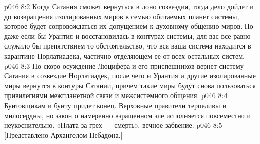 \vs p046 8:2 Когда Сатания сможет вернуться в лоно созвездия, тогда дело дойдет и до возвращения изолированных миров в семью обитаемых планет системы, которое будет сопровождаться их допущением к духовному общению миров. Но даже если бы Урантия и восстановилась в контурах системы, для вас все равно служило бы препятствием то обстоятельство, что вся ваша система находится в карантине Норлатиадека, частично отделяющем ее от всех остальных систем.
\vs p046 8:3 \pc Но скоро осуждение Люцифера и его приспешников вернет систему Сатания в созвездие Норлатиадек, после чего и Урантия и другие изолированные миры вернутся в контуры Сатании, причем такие миры будут снова пользоваться привилегиями межпланетной связи и межсистемного общения.
\vs p046 8:4 \pc Бунтовщикам и бунту придет конец. Верховные правители терпеливы и милосердны, но закон о намеренно взращенном зле исполняется повсеместно и неукоснительно. «Плата за грех --- смерть», вечное забвение.
\vsetoff
\vs p046 8:5 [Представлено Архангелом Небадона.]
